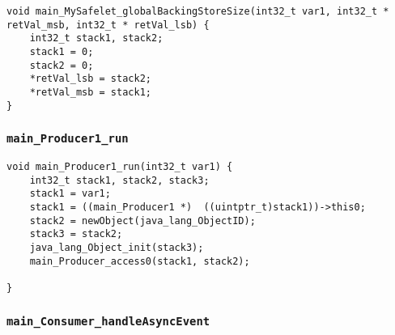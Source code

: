 \begin{landscape}
\begin{multicols}{2}
\begin{lstlisting}[firstnumber=327]
void main_MySafelet_globalBackingStoreSize(int32_t var1, int32_t * retVal_msb, int32_t * retVal_lsb) {
	int32_t stack1, stack2;
	stack1 = 0;
	stack2 = 0;
	*retVal_lsb = stack2;
	*retVal_msb = stack1;
}
\end{lstlisting}

\subsubsection{\texttt{main\_Producer1\_run}}

\begin{lstlisting}[firstnumber=369]
void main_Producer1_run(int32_t var1) {
	int32_t stack1, stack2, stack3;
	stack1 = var1;
	stack1 = ((main_Producer1 *)  ((uintptr_t)stack1))->this0;
	stack2 = newObject(java_lang_ObjectID);
	stack3 = stack2;
	java_lang_Object_init(stack3);
	main_Producer_access0(stack1, stack2);

}
\end{lstlisting}

\subsubsection{\texttt{main\_Consumer\_handleAsyncEvent}}


\end{multicols}
\end{landscape}

